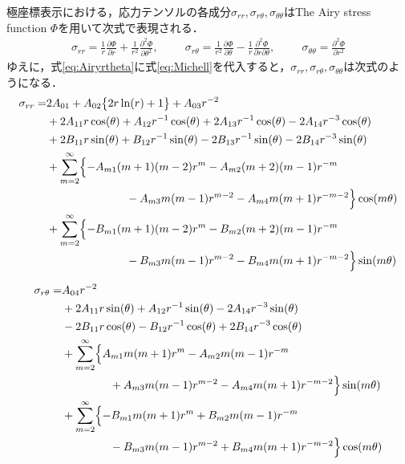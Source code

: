極座標表示における，応力テンソルの各成分$\sigma_{rr},\sigma_{r\theta},\sigma_{\theta\theta}$はThe Airy stress function $\Phi$を用いて次式で表現される．
\begin{align}
	\sigma_{rr}=\frac{1}{r}\frac{\partial \Phi}{\partial r}
	+\frac{1}{r^2}\frac{\partial^2 \Phi}{\partial \theta^2},\hspace{1cm}
	\sigma_{r\theta}=\frac{1}{r^2}\frac{\partial \Phi}{\partial \theta}
	-\frac{1}{r}\frac{\partial^2 \Phi}{\partial r\partial \theta},\hspace{1cm}
	\sigma_{\theta\theta}=\frac{\partial^2 \Phi}{\partial r^2}
	\label{eq:Airyrtheta}
\end{align}
ゆえに，式\eqref{eq:Airyrtheta}に式\eqref{eq:Michell}を代入すると，$\sigma_{rr},\sigma_{r\theta},\sigma_{\theta\theta}$は次式のようになる．
\begin{align}
	\sigma_{rr} =&2A_{01}
	+A_{02}\bigl\{ 2r\ln(r)+1\bigr\}
	+A_{03}r^{-2}
	\nonumber
	\\
	&+2A_{11}r\cos(\theta)
	+A_{12}r^{-1}\cos(\theta)
	+2A_{13}r^{-1}\cos(\theta)
	-2A_{14}r^{-3}\cos(\theta)
	\nonumber
	\\
	&+2B_{11}r\sin(\theta)
	+B_{12}r^{-1}\sin(\theta)
	-2B_{13}r^{-1}\sin(\theta)
	-2B_{14}r^{-3}\sin(\theta)
	\nonumber
	\\
	&+\sum_{m=2}^{\infty}\Bigl\{-A_{m1}(m+1)(m-2)r^{m}
	-A_{m2}(m+2)(m-1)r^{-m}
	\nonumber
	\\
	&\hspace{2.5cm}
	-A_{m3}m(m-1)r^{m-2}
	-A_{m4}m(m+1)r^{-m-2}\Bigr\}\cos(m\theta)
	\nonumber
	\\
	&+\sum_{m=2}^{\infty}\Bigl\{-B_{m1}(m+1)(m-2)r^{m}
	-B_{m2}(m+2)(m-1)r^{-m}
	\nonumber
	\\
	&\hspace{2.5cm}
	-B_{m3}m(m-1)r^{m-2}
	-B_{m4}m(m+1)r^{-m-2}\Bigr\}\sin(m\theta)
	\label{eq:SigmaRR}
\end{align}

\begin{align}
	\sigma_{r\theta} =&A_{04}r^{-2}
	\nonumber
	\\
	&+2A_{11}r\sin(\theta)
	+A_{12}r^{-1}\sin(\theta)
	-2A_{14}r^{-3}\sin(\theta)
	\nonumber
	\\
	&-2B_{11}r\cos(\theta)
	-B_{12}r^{-1}\cos(\theta)
	+2B_{14}r^{-3}\cos(\theta)
	\nonumber
	\\
	&+\sum_{m=2}^{\infty}\Bigl\{A_{m1}m(m+1)r^{m}
	-A_{m2}m(m-1)r^{-m}
	\nonumber
	\\
	&\hspace{1.5cm}
	+A_{m3}m(m-1)r^{m-2}
	-A_{m4}m(m+1)r^{-m-2}\Bigr\}\sin(m\theta)
	\nonumber
	\\
	&+\sum_{m=2}^{\infty}\Bigl\{-B_{m1}m(m+1)r^{m}
	+B_{m2}m(m-1)r^{-m}
	\nonumber
	\\
	&\hspace{1.5cm}
	-B_{m3}m(m-1)r^{m-2}
	+B_{m4}m(m+1)r^{-m-2}\Bigr\}\cos(m\theta)
	\label{eq:SigmaRTh}
\end{align}

